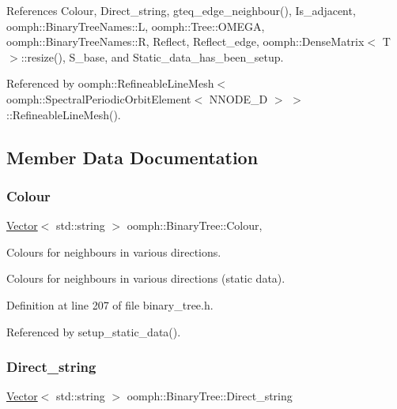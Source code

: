 References Colour, Direct\+\_\+string, gteq\+\_\+edge\+\_\+neighbour(), Is\+\_\+adjacent, oomph\+::\+Binary\+Tree\+Names\+::L, oomph\+::\+Tree\+::\+O\+M\+E\+GA, oomph\+::\+Binary\+Tree\+Names\+::R, Reflect, Reflect\+\_\+edge, oomph\+::\+Dense\+Matrix$<$ T $>$\+::resize(), S\+\_\+base, and Static\+\_\+data\+\_\+has\+\_\+been\+\_\+setup.



Referenced by oomph\+::\+Refineable\+Line\+Mesh$<$ oomph\+::\+Spectral\+Periodic\+Orbit\+Element$<$ N\+N\+O\+D\+E\+\_\+D $>$ $>$\+::\+Refineable\+Line\+Mesh().



\subsection{Member Data Documentation}
\mbox{\label{classoomph_1_1BinaryTree_a14b12263ce207c5ab343cd2bc971b983}} 
\subsubsection{\texorpdfstring{Colour}{Colour}}
{\footnotesize\ttfamily \hyperlink{classoomph_1_1Vector}{Vector}$<$ std\+::string $>$ oomph\+::\+Binary\+Tree\+::\+Colour\hspace{0.3cm}{\ttfamily [static]}, {\ttfamily [private]}}



Colours for neighbours in various directions. 

Colours for neighbours in various directions (static data). 

Definition at line 207 of file binary\+\_\+tree.\+h.



Referenced by setup\+\_\+static\+\_\+data().

\mbox{\label{classoomph_1_1BinaryTree_a24331ca02be2713a58833da84ed02f9b}} 
\subsubsection{\texorpdfstring{Direct\+\_\+string}{Direct\_string}}
{\footnotesize\ttfamily \hyperlink{classoomph_1_1Vector}{Vector}$<$ std\+::string $>$ oomph\+::\+Binary\+Tree\+::\+Direct\+\_\+string\hspace{0.3cm}{\ttfamily [static]}}



